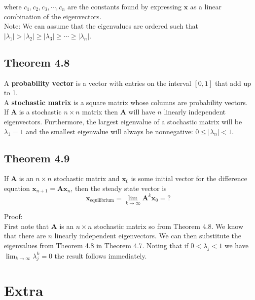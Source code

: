 \documentclass{article}
\begin{document}
\noindent where $c_1,c_2,c_3,\cdots,c_n$ are the constants found by expressing $\boldsymbol{x}$ as a linear combination of the eigenvectors.\\

\noindent Note: We can assume that the eigenvalues are ordered such that $|\lambda_1|>|\lambda_2|\geq|\lambda_3|\geq\cdots\geq|\lambda_n|$.

\subsection*{Theorem 4.8}

A \textbf{probability vector} is a vector with entries on the interval $[0,1]$ that add up to 1.\\

\noindent A \textbf{stochastic matrix} is a square matrix whose columns are probability vectors.\\

\noindent If $\boldsymbol{A}$ is a stochastic $n\times n$ matrix then $\boldsymbol{A}$ will have $n$ linearly independent eigenvectors. Furthermore, the largest eigenvalue of a stochastic matrix will be
$\lambda_1=1$ and the smallest eigenvalue will always be nonnegative: $0\leq|\lambda_n|<1$.\\


\subsection*{Theorem 4.9}

If $\boldsymbol{A}$ is an $n\times n$ stochastic matrix and $\boldsymbol{x}_0$  is some initial vector for the difference equation
$\boldsymbol{x}_{n+1}=\boldsymbol{A}\boldsymbol{x}_n$, then the steady state vector is
$$
\boldsymbol{x}_\text{equilibrium}=\lim_{k\to\infty}\boldsymbol{A}^k\boldsymbol{x}_0=?
$$

\noindent Proof:\\

\noindent First note that $\boldsymbol{A}$ is an $n\times n$ stochastic matrix so from Theorem 4.8. We know that there are $n$ linearly independent eigenvectors.
We can then substitute the eigenvalues from Theorem 4.8 in Theorem 4.7.
Noting that if $0<\lambda_j<1$ we have $\lim_{k\to\infty}\lambda_j^k=0$ the result follows immediately.

\section{Extra}
\end{document}
